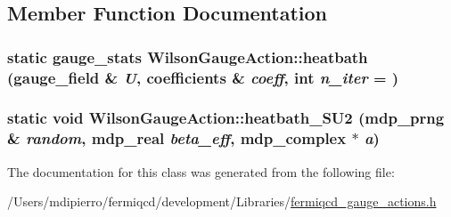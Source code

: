 \subsection{Member Function Documentation}
\hypertarget{class_wilson_gauge_action_a0e5aefe5e3c15f35d0fbcd8e6269b919}{
\subsubsection[{heatbath}]{\setlength{\rightskip}{0pt plus 5cm}static {\bf gauge\_\-stats} WilsonGaugeAction::heatbath ({\bf gauge\_\-field} \& {\em U}, \/  {\bf coefficients} \& {\em coeff}, \/  int {\em n\_\-iter} = {})}}
\label{class_wilson_gauge_action_a0e5aefe5e3c15f35d0fbcd8e6269b919}
\hypertarget{class_wilson_gauge_action_a95c910d9c558320e8a55ff04f330d02d}{
\subsubsection[{heatbath\_\-SU2}]{\setlength{\rightskip}{0pt plus 5cm}static void WilsonGaugeAction::heatbath\_\-SU2 ({\bf mdp\_\-prng} \& {\em random}, \/  {\bf mdp\_\-real} {\em beta\_\-eff}, \/  {\bf mdp\_\-complex} $\ast$ {\em a})}}
\label{class_wilson_gauge_action_a95c910d9c558320e8a55ff04f330d02d}


The documentation for this class was generated from the following file:\begin{DoxyCompactItemize}
\item 
/Users/mdipierro/fermiqcd/development/Libraries/\hyperlink{fermiqcd__gauge__actions_8h}{fermiqcd\_\-gauge\_\-actions.h}\end{DoxyCompactItemize}
